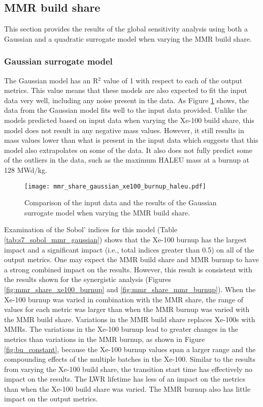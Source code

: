 \subsection{MMR build share}
This section provides the results of the global sensitivity analysis using 
both a Gaussian and a quadratic surrogate model when varying the \gls{MMR} 
build share. 

\subsubsection{Gaussian surrogate model}
The Gaussian model has an R$^2$ value of 1 with respect to each of the output 
metrics. This value means that these models are also expected to fit the input 
data very well, including any noise present in the data. As Figure 
\ref{fig:s7_mmr_gaussian} shows, the data from the Gaussian model fits well 
to the input data provided. Unlike the models predicted based on input data when 
varying the Xe-100 build share, this model does not result in any negative 
mass values. However, it still results in mass values lower than what is 
present in the input data which suggests that this model also extrapolates 
on some of the data. It also does not fully predict some of the outliers in 
the data, such as the maximum \gls{HALEU} mass at a burnup at 128 MWd/kg.

\begin{figure}[h!]
    \centering 
    \texttt{[image: mmr\_share\_gaussian\_xe100\_burnup\_haleu.pdf]}
    \caption{Comparison of the input data and the results of the Gaussian 
    surrogate model when varying the MMR build share.}
    \label{fig:s7_mmr_gaussian}
\end{figure}

Examination of the Sobol' indices for this model (Table \ref{tab:s7_sobol_mmr_gaussian})
shows that the Xe-100 burnup has the largest impact and a significant impact (i.e., 
total indices greater than 0.5) on all of the 
output metrics. One may expect the \gls{MMR} 
build share and \gls{MMR} burnup to have a strong combined impact on 
the results. However, this result is consistent with the results 
shown for the synergistic analysis (Figures \ref{fig:mmr_share_xe100_burnup} and 
\ref{fig:mmr_share_mmr_burnup}). When the Xe-100 burnup was varied in combination 
with the \gls{MMR} share, the range of values for each metric was larger than 
when the \gls{MMR} burnup was varied with the \gls{MMR} build share. Variations 
in the \gls{MMR} build share replaces Xe-100s with \glspl{MMR}. The variations 
in the Xe-100 burnup lead to greater changes in the metrics than variations 
in the \gls{MMR} burnup, as shown in Figure \ref{fig:bu_constant}, because 
the Xe-100 burnup values span a larger range and the compounding effects of the 
multiple batches in the Xe-100. 
Similar to the results from varying the Xe-100 build share, the 
transition start time has effectively no impact on the results. The \gls{LWR} 
lifetime has less of an impact on the metrics than when the Xe-100 
build share was varied. The \gls{MMR} burnup also has little impact on the 
output metrics. 

